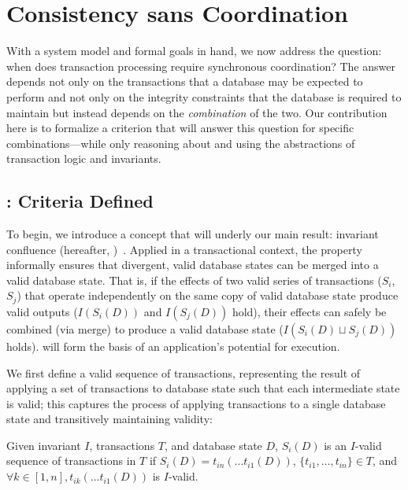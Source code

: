 
\section{Consistency sans Coordination}
\label{sec:bcc-theory}

With a system model and formal goals in hand, we now address the
question: when does transaction processing require synchronous
coordination? The answer depends not only on the transactions that a
database may be expected to perform and not only on the integrity
constraints that the database is required to maintain but instead
depends on the \textit{combination} of the two. Our contribution here
is to formalize a criterion that will answer this question for
specific combinations---while only reasoning about and using the
abstractions of transaction logic and invariants.

\subsection{\iconfluence: Criteria Defined}

To begin, we introduce a concept that will underly our main result:
invariant confluence (hereafter,
\iconfluence)~\cite{obs-confluence}. Applied in a transactional
context, the \iconfluence property informally ensures that divergent,
valid database states can be merged into a valid database state. That
is, if the effects of two valid series of transactions ($S_i$, $S_j$)
that operate independently on the same copy of valid database state
produce valid outputs ($I(S_i(D))$ and $I(S_j(D))$ hold), their
effects can safely be combined (via merge) to produce a valid database
state ($I(S_i(D) \sqcup S_j(D))$ holds). \iconfluence will form the
basis of an application's potential for \cfree execution.

We first define a valid sequence of transactions, representing the
result of applying a set of transactions to database state such that
each intermediate state is valid; this captures the process of
applying transactions to a single database state and transitively
maintaining validity:

\begin{definition}
Given invariant $I$, transactions $T$, and database state $D$,
$S_i(D)$ is an $I$-valid sequence of transactions in $T$ if $S_i(D) =
t_{in}(\dots t_{i1}(D))$, $\{t_{i1}, \dots, t_{in}\} \in T$, and
$\forall k \in [1, n], t_{ik}(\dots t_{i1}(D))$ is $I$-valid.
\end{definition}

